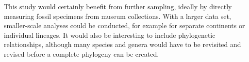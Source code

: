 This study would certainly benefit from further sampling, ideally by directly measuring fossil specimens from museum collections.
With a larger data set, smaller-scale analyses could be conducted, for example for separate continents or individual lineages.
It would also be interesting to include phylogenetic relationships, although many species and genera would have to be revisited and revised before a complete phylogeny can be created.

















